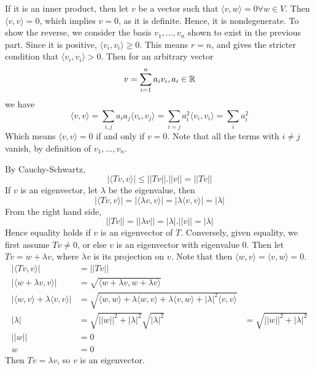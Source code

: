 \documentclass[answers]{exam}
\begin{document}
\begin{questions}
\begin{parts}
	\begin{solution}
		If it is an inner product, then let $v$ be a vector such that $\langle v,w \rangle = 0 \forall w \in V$. Then $\langle v,v \rangle = 0$, which implies $v = 0$, as it is definite. Hence, it is nondegenerate. To show the reverse, we consider the basis $v_1,\dots,v_n$ shown to exist in the previous part. Since it is positive, $\langle v_i,v_i \rangle \geq 0$. This means $r=n$, and gives the stricter condition that $\langle v_i,v_i \rangle > 0$. Then for an arbitrary vector
		$$v = \sum_{i=1}^n a_iv_i, a_i \in \mathbb{R}$$
		we have
		$$\langle v,v \rangle = \sum_{i,j} a_ia_j \langle v_i,v_j \rangle = \sum_{i=j} a_i^2 \langle v_i,v_i \rangle = \sum_i a_i^2$$
		Which means $\langle v,v \rangle = 0$ if and only if $v=0$. Note that all the terms with $i \neq j$ vanish, by definition of $v_1,\dots,v_n$.
	\end{solution}
\end{parts}


\begin{solution}
	By Cauchy-Schwartz,
	$$|\langle Tv,v \rangle| \leq ||Tv||.||v|| = ||Tv||$$
	If $v$ is an eigenvector, let $\lambda$ be the eigenvalue, then
	$$|\langle Tv,v \rangle| = |\langle \lambda v,v \rangle| = |\lambda \langle v,v \rangle| = |\lambda|$$
	From the right hand side,
	$$||Tv|| = ||\lambda v|| = |\lambda|.||v|| = |\lambda|$$
	Hence equality holds if $v$ is an eigenvector of $T$. Conversely, given equality, we first assume $Tv \neq 0$, or else $v$ is an eigenvector with eigenvalue 0. Then let $Tv = w + \lambda v$, where $\lambda v$ is its projection on $v$. Note that then $\langle w,v \rangle = \langle v,w \rangle = 0$.
	\begin{align*}
		|\langle Tv,v \rangle| &= ||Tv|| \\
		|\langle w + \lambda v,v \rangle| &= \sqrt{\langle w + \lambda v, w + \lambda v \rangle} \\
		|\langle w,v \rangle + \lambda \langle v,v \rangle| &= \sqrt{\langle w,w \rangle + \lambda \langle w,v \rangle + \lambda \langle v,w \rangle + |\lambda|^2 \langle v,v \rangle} \\
		|\lambda| &= \sqrt{||w||^2 + |\lambda|^2}
		\sqrt{|\lambda|^2} &= \sqrt{||w||^2 + |\lambda|^2} \\
		||w|| &= 0 \\
		w &= 0
	\end{align*}
	Then $Tv = \lambda v$, so $v$ is an eigenvector.
\end{solution}

\end{questions}
\end{document}
